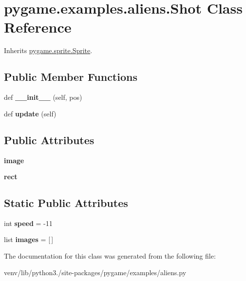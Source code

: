 \hypertarget{classpygame_1_1examples_1_1aliens_1_1_shot}{}\section{pygame.\+examples.\+aliens.\+Shot Class Reference}
\label{classpygame_1_1examples_1_1aliens_1_1_shot}


Inherits \hyperlink{classpygame_1_1sprite_1_1_sprite}{pygame.\+sprite.\+Sprite}.

\subsection*{Public Member Functions}
\begin{DoxyCompactItemize}
\item 
\mbox{\label{classpygame_1_1examples_1_1aliens_1_1_shot_ab66d59e9ff3faf57d7b2666be8d18bfd}} 
def {\bfseries \+\_\+\+\_\+init\+\_\+\+\_\+} (self, pos)
\item 
\mbox{\label{classpygame_1_1examples_1_1aliens_1_1_shot_a79d229cc9a5bc1b3520d3f88bf2dc844}} 
def {\bfseries update} (self)
\end{DoxyCompactItemize}
\subsection*{Public Attributes}
\begin{DoxyCompactItemize}
\item 
\mbox{\label{classpygame_1_1examples_1_1aliens_1_1_shot_afe7df7ac13ad3441ef8d44ad28b6df37}} 
{\bfseries image}
\item 
\mbox{\label{classpygame_1_1examples_1_1aliens_1_1_shot_ae182f5b0f9fb9c8add834344c40e6b19}} 
{\bfseries rect}
\end{DoxyCompactItemize}
\subsection*{Static Public Attributes}
\begin{DoxyCompactItemize}
\item 
\mbox{\label{classpygame_1_1examples_1_1aliens_1_1_shot_a88fc5acf860044361412f64e919f82d8}} 
int {\bfseries speed} = -\/11
\item 
\mbox{\label{classpygame_1_1examples_1_1aliens_1_1_shot_a4fca68eda98dc93821348f933233f963}} 
list {\bfseries images} = \mbox{[}$\,$\mbox{]}
\end{DoxyCompactItemize}


The documentation for this class was generated from the following file\+:\begin{DoxyCompactItemize}
\item 
venv/lib/python3./site-\/packages/pygame/examples/aliens.\+py\end{DoxyCompactItemize}

